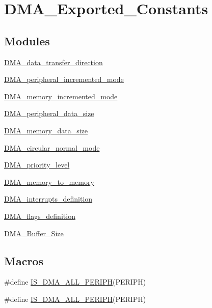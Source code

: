 \hypertarget{group___d_m_a___exported___constants}{}\section{D\+M\+A\+\_\+\+Exported\+\_\+\+Constants}
\label{group___d_m_a___exported___constants}
\subsection*{Modules}
\begin{DoxyCompactItemize}
\item 
\hyperlink{group___d_m_a__data__transfer__direction}{D\+M\+A\+\_\+data\+\_\+transfer\+\_\+direction}
\item 
\hyperlink{group___d_m_a__peripheral__incremented__mode}{D\+M\+A\+\_\+peripheral\+\_\+incremented\+\_\+mode}
\item 
\hyperlink{group___d_m_a__memory__incremented__mode}{D\+M\+A\+\_\+memory\+\_\+incremented\+\_\+mode}
\item 
\hyperlink{group___d_m_a__peripheral__data__size}{D\+M\+A\+\_\+peripheral\+\_\+data\+\_\+size}
\item 
\hyperlink{group___d_m_a__memory__data__size}{D\+M\+A\+\_\+memory\+\_\+data\+\_\+size}
\item 
\hyperlink{group___d_m_a__circular__normal__mode}{D\+M\+A\+\_\+circular\+\_\+normal\+\_\+mode}
\item 
\hyperlink{group___d_m_a__priority__level}{D\+M\+A\+\_\+priority\+\_\+level}
\item 
\hyperlink{group___d_m_a__memory__to__memory}{D\+M\+A\+\_\+memory\+\_\+to\+\_\+memory}
\item 
\hyperlink{group___d_m_a__interrupts__definition}{D\+M\+A\+\_\+interrupts\+\_\+definition}
\item 
\hyperlink{group___d_m_a__flags__definition}{D\+M\+A\+\_\+flags\+\_\+definition}
\item 
\hyperlink{group___d_m_a___buffer___size}{D\+M\+A\+\_\+\+Buffer\+\_\+\+Size}
\end{DoxyCompactItemize}
\subsection*{Macros}
\begin{DoxyCompactItemize}
\item 
\#define \hyperlink{group___d_m_a___exported___constants_gabcab9fa1c48b148703a8f41c1d99e0c8}{I\+S\+\_\+\+D\+M\+A\+\_\+\+A\+L\+L\+\_\+\+P\+E\+R\+I\+PH}(P\+E\+R\+I\+PH)
\item 
\#define \hyperlink{group___d_m_a___exported___constants_gabcab9fa1c48b148703a8f41c1d99e0c8}{I\+S\+\_\+\+D\+M\+A\+\_\+\+A\+L\+L\+\_\+\+P\+E\+R\+I\+PH}(P\+E\+R\+I\+PH)
\end{DoxyCompactItemize}


